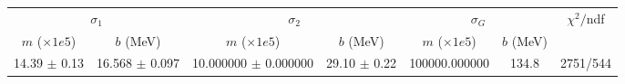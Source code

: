 \begin{tabular}{cc|cc|cc||c}
\multicolumn{2}{c|}{$\sigma_1$} & \multicolumn{2}{|c}{$\sigma_2$} & \multicolumn{2}{|c}{$\sigma_G$}  & \multirow{2}{*}{$\chi^2/$ndf}\\
$m$ ($\times1e5$) & $b$ (MeV) & $m$ ($\times1e5$) & $b$ (MeV) & $m$ ($\times1e5$) & $b$ (MeV) & \\
\hline
14.39 $\pm$ 0.13 & 16.568 $\pm$ 0.097 & 10.000000 $\pm$ 0.000000 & 29.10 $\pm$ 0.22 & 100000.000000 & 134.8 & 2751/544\\
\end{tabular}
